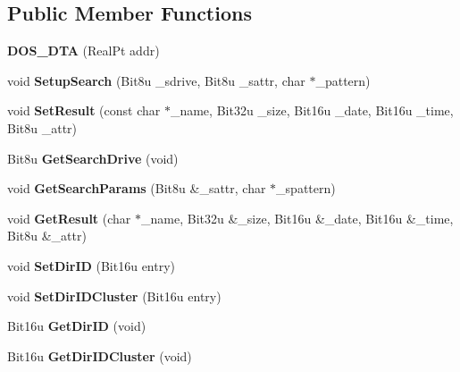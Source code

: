 \subsection*{Public Member Functions}
\begin{DoxyCompactItemize}
\item 
\hypertarget{classDOS__DTA_a26b5d5147e35f2b65dd6ef0cae1734e5}{{\bfseries D\-O\-S\-\_\-\-D\-T\-A} (Real\-Pt addr)}\label{classDOS__DTA_a26b5d5147e35f2b65dd6ef0cae1734e5}

\item 
\hypertarget{classDOS__DTA_ae15099c285096d3c32ef7b0f947a338d}{void {\bfseries Setup\-Search} (Bit8u \-\_\-sdrive, Bit8u \-\_\-sattr, char $\ast$\-\_\-pattern)}\label{classDOS__DTA_ae15099c285096d3c32ef7b0f947a338d}

\item 
\hypertarget{classDOS__DTA_ae09318ca38b32bff0df8a0ee88ec2151}{void {\bfseries Set\-Result} (const char $\ast$\-\_\-name, Bit32u \-\_\-size, Bit16u \-\_\-date, Bit16u \-\_\-time, Bit8u \-\_\-attr)}\label{classDOS__DTA_ae09318ca38b32bff0df8a0ee88ec2151}

\item 
\hypertarget{classDOS__DTA_a055cb2b2f1fcf3fd76ee76bbd608da30}{Bit8u {\bfseries Get\-Search\-Drive} (void)}\label{classDOS__DTA_a055cb2b2f1fcf3fd76ee76bbd608da30}

\item 
\hypertarget{classDOS__DTA_a770f5e91477a855386972cc2d530a346}{void {\bfseries Get\-Search\-Params} (Bit8u \&\-\_\-sattr, char $\ast$\-\_\-spattern)}\label{classDOS__DTA_a770f5e91477a855386972cc2d530a346}

\item 
\hypertarget{classDOS__DTA_a42642ddf3f4fceb24592262dd3221cac}{void {\bfseries Get\-Result} (char $\ast$\-\_\-name, Bit32u \&\-\_\-size, Bit16u \&\-\_\-date, Bit16u \&\-\_\-time, Bit8u \&\-\_\-attr)}\label{classDOS__DTA_a42642ddf3f4fceb24592262dd3221cac}

\item 
\hypertarget{classDOS__DTA_ae695e3b2d7507351b4f68fd855f62942}{void {\bfseries Set\-Dir\-I\-D} (Bit16u entry)}\label{classDOS__DTA_ae695e3b2d7507351b4f68fd855f62942}

\item 
\hypertarget{classDOS__DTA_a9077446d68d8383d59a932d55ad4ddc4}{void {\bfseries Set\-Dir\-I\-D\-Cluster} (Bit16u entry)}\label{classDOS__DTA_a9077446d68d8383d59a932d55ad4ddc4}

\item 
\hypertarget{classDOS__DTA_ac6562d1dd41f1f2b0874647e82a62289}{Bit16u {\bfseries Get\-Dir\-I\-D} (void)}\label{classDOS__DTA_ac6562d1dd41f1f2b0874647e82a62289}

\item 
\hypertarget{classDOS__DTA_a1a098a058e4f8237ecc38ed147033f9b}{Bit16u {\bfseries Get\-Dir\-I\-D\-Cluster} (void)}\label{classDOS__DTA_a1a098a058e4f8237ecc38ed147033f9b}

\end{DoxyCompactItemize}


